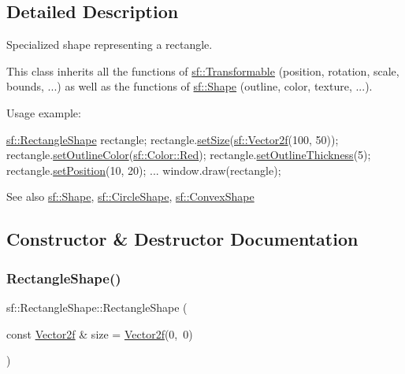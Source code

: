 \subsection{Detailed Description}
Specialized shape representing a rectangle. 

This class inherits all the functions of \hyperlink{classsf_1_1_transformable}{sf\+::\+Transformable} (position, rotation, scale, bounds, ...) as well as the functions of \hyperlink{classsf_1_1_shape}{sf\+::\+Shape} (outline, color, texture, ...).

Usage example\+: 
\begin{DoxyCode}
\hyperlink{classsf_1_1_rectangle_shape}{sf::RectangleShape} rectangle;
rectangle.\hyperlink{classsf_1_1_rectangle_shape_a5c65d374d4a259dfdc24efdd24a5dbec}{setSize}(\hyperlink{classsf_1_1_vector2}{sf::Vector2f}(100, 50));
rectangle.\hyperlink{classsf_1_1_shape_a5978f41ee349ac3c52942996dcb184f7}{setOutlineColor}(\hyperlink{classsf_1_1_color_a127dbf55db9c07d0fa8f4bfcbb97594a}{sf::Color::Red});
rectangle.\hyperlink{classsf_1_1_shape_a5ad336ad74fc1f567fce3b7e44cf87dc}{setOutlineThickness}(5);
rectangle.\hyperlink{classsf_1_1_transformable_a4dbfb1a7c80688b0b4c477d706550208}{setPosition}(10, 20);
...
window.draw(rectangle);
\end{DoxyCode}


\begin{DoxySeeAlso}{See also}
\hyperlink{classsf_1_1_shape}{sf\+::\+Shape}, \hyperlink{classsf_1_1_circle_shape}{sf\+::\+Circle\+Shape}, \hyperlink{classsf_1_1_convex_shape}{sf\+::\+Convex\+Shape} 
\end{DoxySeeAlso}


\subsection{Constructor \& Destructor Documentation}
\mbox{\label{classsf_1_1_rectangle_shape_a83a2be157ebee85c95ed491c3e78dd7c}} 
\subsubsection{\texorpdfstring{Rectangle\+Shape()}{RectangleShape()}}
{\footnotesize\ttfamily sf\+::\+Rectangle\+Shape\+::\+Rectangle\+Shape (\begin{DoxyParamCaption}\item[{const \hyperlink{classsf_1_1_vector2}{Vector2f} \&}]{size = {\ttfamily \hyperlink{classsf_1_1_vector2}{Vector2f}(0,~0)} }\end{DoxyParamCaption})\hspace{0.3cm}{\ttfamily [explicit]}}



